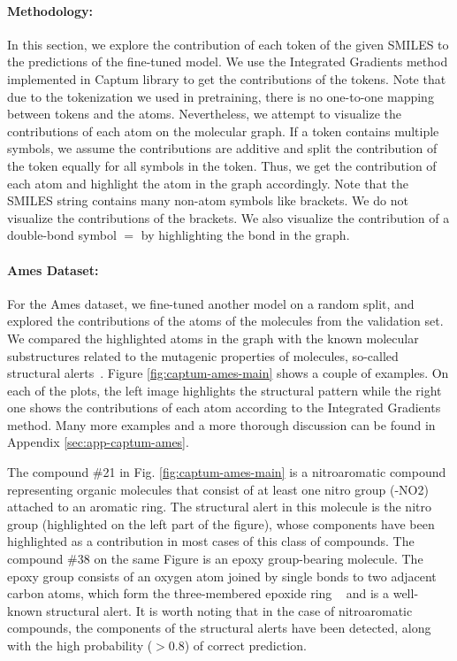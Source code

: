 \documentclass{article} %
\begin{document}
\paragraph{Methodology:}
In this section, we explore the contribution of each token of the given SMILES to the predictions of the fine-tuned model. We use the Integrated Gradients method \citep{integrated-gradients} implemented in Captum library \citep{captum} to get the contributions of the tokens. Note that due to the tokenization we used in pretraining, there is no one-to-one mapping between tokens and the atoms. Nevertheless, we attempt to visualize the contributions of each atom on the molecular graph. If a token contains multiple symbols, we assume the contributions are additive and split the contribution of the token equally for all symbols in the token. Thus, we get the contribution of each atom and highlight the atom in the graph accordingly. Note that the SMILES string contains many non-atom symbols like brackets. We do not visualize the contributions of the brackets. We also visualize the contribution of a double-bond symbol $=$ by highlighting the bond in the graph. 
\paragraph{Ames Dataset:}
\vspace{-1em}
For the Ames dataset, we fine-tuned another model on a random split, and explored the contributions of the atoms of the molecules from the validation set. We compared the highlighted atoms in the graph with the known molecular substructures related to the mutagenic properties of molecules, so-called structural alerts~\citep{tox-structural-alerts}. Figure \ref{fig:captum-ames-main} shows a couple of examples. On each of the plots, the left image highlights the structural pattern while the right one shows the contributions of each atom according to the Integrated Gradients method. Many more examples and a more thorough discussion can be found in Appendix \ref{sec:app-captum-ames}. 

The compound \#21 in Fig. \ref{fig:captum-ames-main} is a nitroaromatic compound representing organic molecules that consist of at least one nitro group (-NO2) attached to an aromatic ring. The structural alert in this molecule is the nitro group (highlighted on the left part of the figure), whose components have been highlighted %
as a contribution in most cases of this class of compounds. The compound \#38 on the same Figure is an epoxy group-bearing molecule. The epoxy group consists of an oxygen atom joined by single bonds to two adjacent carbon atoms, which form the three-membered epoxide ring ~\citep{tox-structural-alerts} and is a well-known structural alert. It is worth noting that in the case of nitroaromatic compounds, the components of the structural alerts have been detected, along with the high probability ($>0.8$) of correct prediction. 
\end{document}
